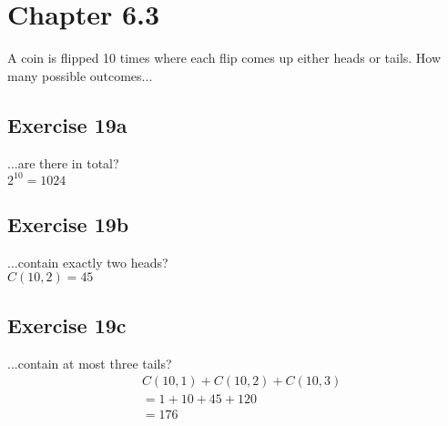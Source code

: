 \documentclass[12pt]{article}
\begin{document}
    \section{Chapter 6.3}
    A coin is flipped 10 times where each flip comes up either heads or tails. How many possible outcomes...

    \subsection{Exercise 19a}
    ...are there in total?\\
    $2^{10}=1024$

    \subsection{Exercise 19b}
    ...contain exactly two heads?\\
    $C(10,2)=45$

    \subsection{Exercise 19c}
    ...contain at most three tails?
    \begin{equation}
      \begin{split}
        &C(10,1)+C(10,2)+C(10,3)\\
        &=1+10+45+120\\
        &=176        
      \end{split}
    \end{equation}
\end{document}
